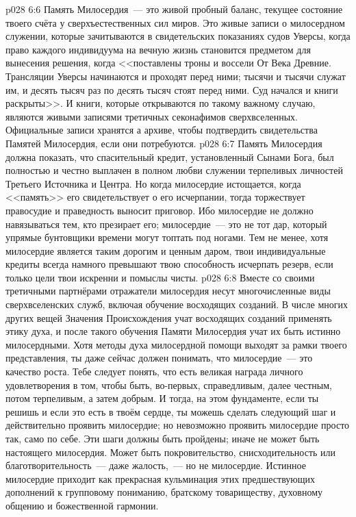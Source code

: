 \vs p028 6:6 Память Милосердия~--- это живой пробный баланс, текущее состояние твоего счёта у сверхъестественных сил миров. Это живые записи о милосердном служении, которые зачитываются в свидетельских показаниях судов Уверсы, когда право каждого индивидуума на вечную жизнь становится предметом для вынесения решения, когда <<поставлены троны и воссели От Века Древние. Трансляции Уверсы начинаются и проходят перед ними; тысячи и тысячи служат им, и десять тысяч раз по десять тысяч стоят перед ними. Суд начался и книги раскрыты>>. И книги, которые открываются по такому важному случаю, являются живыми записями третичных секонафимов сверхвселенных. Официальные записи хранятся а архиве, чтобы подтвердить свидетельства Памятей Милосердия, если они потребуются.
\vs p028 6:7 Память Милосердия должна показать, что спасительный кредит, установленный Сынами Бога, был полностью и честно выплачен в полном любви служении терпеливых личностей Третьего Источника и Центра. Но когда милосердие истощается, когда <<память>> его свидетельствует о его исчерпании, тогда торжествует правосудие и праведность выносит приговор. Ибо милосердие не должно навязываться тем, кто презирает его; милосердие~--- это не тот дар, который упрямые бунтовщики времени могут топтать под ногами. Тем не менее, хотя милосердие является таким дорогим и ценным даром, твои индивидуальные кредиты всегда намного превышают твою способность исчерпать резерв, если только цели твои искренни и помыслы чисты.
\vs p028 6:8 \pc Вместе со своими третичными партнёрами отражатели милосердия несут многочисленные виды сверхвселенских служб, включая обучение восходящих созданий. В числе многих других вещей Значения Происхождения учат восходящих созданий применять этику духа, и после такого обучения Памяти Милосердия учат их быть истинно милосердными. Хотя методы духа милосердной помощи выходят за рамки твоего представления, ты даже сейчас должен понимать, что милосердие~--- это качество роста. Тебе следует понять, что есть великая награда личного удовлетворения в том, чтобы быть, во\hyp{}первых, справедливым, далее честным, потом терпеливым, а затем добрым. И тогда, на этом фундаменте, если ты решишь и если это есть в твоём сердце, ты можешь сделать следующий шаг и действительно проявить милосердие; но невозможно проявить милосердие просто так, само по себе. Эти шаги должны быть пройдены; иначе не может быть настоящего милосердия. Может быть покровительство, снисходительность или благотворительность~--- даже жалость,~--- но не милосердие. Истинное милосердие приходит как прекрасная кульминация этих предшествующих дополнений к групповому пониманию, братскому товариществу, духовному общению и божественной гармонии.
